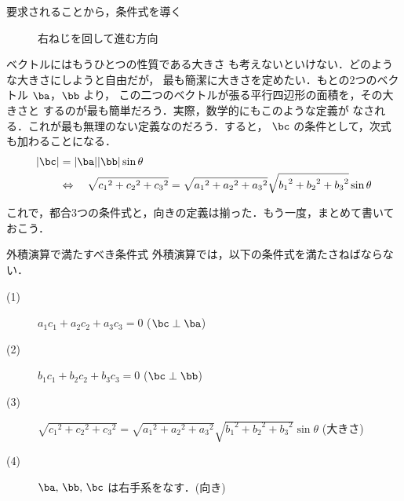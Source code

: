 \begin{mysmallsec}{要求されることから，条件式を導く}
                    \begin{figure}[hbt]
                        \begin{center}
                            \caption{右ねじを回して進む方向}
                            \label{fig:migineji_01}
                        \end{center}
                    \end{figure}

                ベクトルにはもうひとつの性質である大きさ
                も考えないといけない．どのような大きさにしようと自由だが，
                最も簡潔に大きさを定めたい．もとの2つのベクトル $\ba$，$\bb$ より，
                この二つのベクトルが張る平行四辺形の面積を，その大きさと
                するのが最も簡単だろう．実際，数学的にもこのような定義が
                なされる．これが最も無理のない定義なのだろう．すると，
                $\bc$ の条件として，次式も加わることになる．
                    \begin{align*}
                        |\bc| &= | \ba || \bb | \sin\theta \\
                        &\Leftrightarrow \quad
                        \sqrt{{c_{1}}^{2}+{c_{2}}^{2}+{c_{3}}^{2}}
                        =
                        \sqrt{{a_{1}}^{2}+{a_{2}}^{2}+{a_{3}}^{2}}
                        \sqrt{{b_{1}}^{2}+{b_{2}}^{2}+{b_{3}}^{2}}
                        \sin\theta
                    \end{align*}

                これで，都合3つの条件式と，向きの定義は揃った．もう一度，まとめて書いておこう．
                \\
                \begin{itembox}[a]{外積演算で満たすべき条件式}
                    外積演算では，以下の条件式を満たさねばならない．
                    \begin{description}
                        \item[(1)] $a_{1}c_{1} + a_{2}c_{2} + a_{3}c_{3} = 0$ ($\bc \perp \ba$)
                        \item[(2)] $b_{1}c_{1} + b_{2}c_{2} + b_{3}c_{3} = 0$ ($\bc \perp \bb$)
                        \item[(3)] $\sqrt{{c_{1}}^{2}+{c_{2}}^{2}+{c_{3}}^{2}}
                               = \sqrt{{a_{1}}^{2}+{a_{2}}^{2}+{a_{3}}^{2}}
                                 \sqrt{{b_{1}}^{2}+{b_{2}}^{2}+{b_{3}}^{2}}
                                 \sin\theta$ (大きさ)
                        \item[(4)] $\ba,\,\bb,\,\bc$ は右手系をなす．(向き)
                    \end{description}
                \end{itembox}
                \\


\end{mysmallsec}
